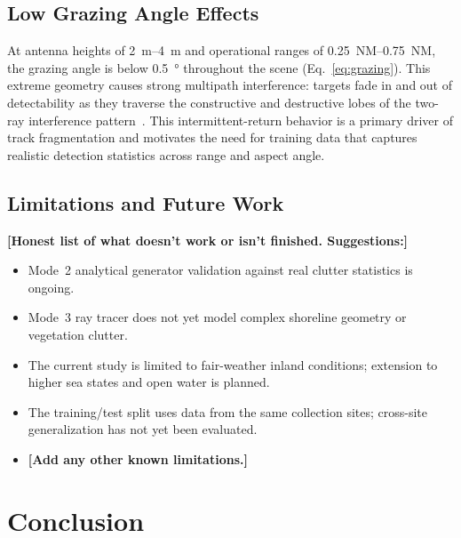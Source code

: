 \documentclass[twocolumn, 10pt]{article}
\newcommand{\ph}[1]{\textbf{[#1]}}
\begin{document}
\subsection{Low Grazing Angle Effects}

At antenna heights of \SIrange{2}{4}{\meter} and operational ranges of \SIrange{0.25}{0.75}{NM}, the grazing angle is below \SI{0.5}{\degree} throughout the scene (Eq.~\ref{eq:grazing}). This extreme geometry causes strong multipath interference: targets fade in and out of detectability as they traverse the constructive and destructive lobes of the two-ray interference pattern~\cite{long2001radar}. This intermittent-return behavior is a primary driver of track fragmentation and motivates the need for training data that captures realistic detection statistics across range and aspect angle.

\subsection{Limitations and Future Work}

\ph{Honest list of what doesn't work or isn't finished. Suggestions:}
\begin{itemize}
    \item Mode~2 analytical generator validation against real clutter statistics is ongoing.
    \item Mode~3 ray tracer does not yet model complex shoreline geometry or vegetation clutter.
    \item The current study is limited to fair-weather inland conditions; extension to higher sea states and open water is planned.
    \item The training/test split uses data from the same collection sites; cross-site generalization has not yet been evaluated.
    \item \ph{Add any other known limitations.}
\end{itemize}

\section{Conclusion}
\label{sec:conclusion}
\end{document}
